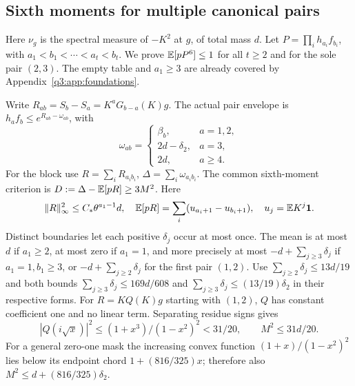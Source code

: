 \subsection{Sixth moments for multiple canonical pairs}\label{loc:S2}
Here $\nu_g$ is the spectral measure of $-K^2$ at $g$, of total mass $d$.
Let $P=\prod_{i} h_{a_i}f_{b_i}$, with
$a_1<b_1<\cdots<a_t<b_t$. We prove $\mathbb E[pP^6]\le1$ for all $t\ge2$
and for the sole pair $(2,3)$. The empty table and $a_1\ge3$ are already
covered by Appendix~\ref{q3:app:foundations}.

Write $R_{ab}=S_b-S_a=K^aG_{b-a}(K)g$.
The actual pair envelope is $h_af_b\le e^{R_{ab}-\omega_{ab}}$, with
\[
 \omega_{ab}=\begin{cases}
 \beta_b,&a=1,2,\\2d-\delta_{2},&a=3,\\2d,&a\ge4.
 \end{cases}
\]
For the block use $R=\sum_iR_{a_ib_i}$, $\Delta=\sum_i\omega_{a_ib_i}$.
The common sixth-moment criterion is $D:=\Delta-\mathbb E[pR]\ge3M^2$.
Here
\[
 \|R\|_\infty^2\le C_*\theta^{a_1-1}d,\quad
 \mathbb E[pR]=\sum_i(u_{a_i+1}-u_{b_i+1}),\quad u_j=\mathbb E K^j\mathbf1.
\]
Distinct boundaries let each positive $\delta_{j}$ occur at most once. The mean is
at most $d$ if $a_1\ge2$, at most zero if $a_1=1$, and more precisely
at most $-d+\sum_{j\ge3}\delta_{j}$ if $a_1=1,b_1\ge3$, or
$-d+\sum_{j\ge2}\delta_{j}$ for the first pair $(1,2)$.
Use $\sum_{j\ge2}\delta_{j}\le13d/19$ and both bounds
$\sum_{j\ge3}\delta_{j}\le169d/608$ and
$\sum_{j\ge3}\delta_{j}\le(13/19)\delta_{2}$ in their respective forms.
For $R=KQ(K)g$ starting with $(1,2)$, $Q$ has constant coefficient one
and no linear term. Separating residue signs gives
\[
 |Q(i\sqrt x)|^2\le(1+x^3)/(1-x^2)^2<31/20,
 \qquad M^2\le31d/20.
\]
For a general zero-one mask the increasing convex function
$(1+x)/(1-x^2)^2$ lies below its endpoint chord
$1+(816/325)x$; therefore also
$M^2\le d+(816/325)\delta_{2}$.

